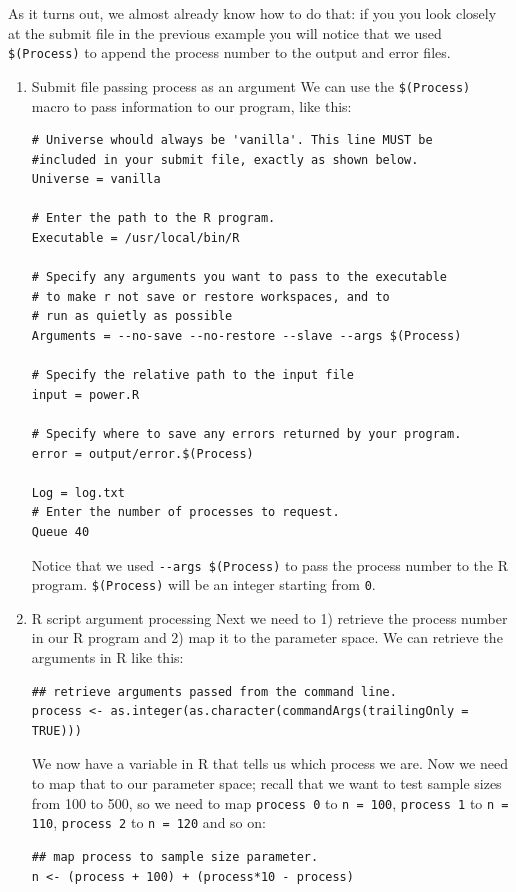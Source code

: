 \documentclass[11pt]{article}
\begin{document}
As it turns out, we almost already know how to do that: if you you look closely at the submit file in the previous example you will notice that we used \texttt{\$(Process)} to append the process number to the output and error files. 
\begin{enumerate}
\item Submit file passing process as an argument
\label{sec:org8e1de47}
We can use the \texttt{\$(Process)} macro to pass information to our program, like this:
\begin{verbatim}
# Universe whould always be 'vanilla'. This line MUST be 
#included in your submit file, exactly as shown below.
Universe = vanilla

# Enter the path to the R program.
Executable = /usr/local/bin/R

# Specify any arguments you want to pass to the executable
# to make r not save or restore workspaces, and to 
# run as quietly as possible
Arguments = --no-save --no-restore --slave --args $(Process)

# Specify the relative path to the input file
input = power.R

# Specify where to save any errors returned by your program.
error = output/error.$(Process)

Log = log.txt
# Enter the number of processes to request.
Queue 40
\end{verbatim}
Notice that we used \texttt{-{}-args \$(Process)} to pass the process number to the R program. \texttt{\$(Process)} will be an integer starting from \texttt{0}. 

\item R script argument processing
\label{sec:org4327834}
Next we need to 1) retrieve the process number in our R program and 2) map it to the parameter space. We can retrieve the arguments in R like this:
\begin{verbatim}
## retrieve arguments passed from the command line.
process <- as.integer(as.character(commandArgs(trailingOnly = TRUE)))
\end{verbatim}
We now have a variable in R that tells us which process we are. Now we need to map that to our parameter space; recall that we want to test sample sizes from 100 to 500, so we need to map \texttt{process 0} to \texttt{n = 100},  \texttt{process 1} to \texttt{n = 110}, \texttt{process 2} to \texttt{n = 120} and so on:
\begin{verbatim}
## map process to sample size parameter.
n <- (process + 100) + (process*10 - process)
\end{verbatim}


\end{enumerate}
\end{document}
